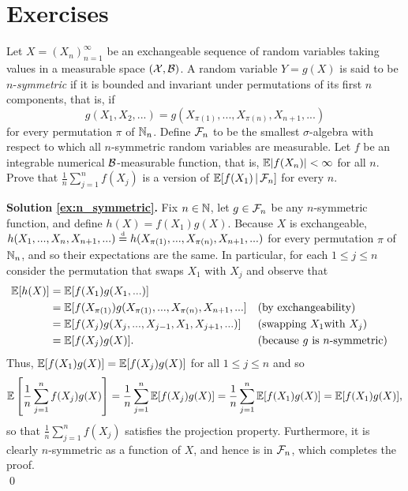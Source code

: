 

\section{Exercises}


\begin{exercise} \label{ex:n_symmetric}
	Let $X = (X_n)_{n=1}^{\infty}$ be an exchangeable sequence of random variables taking values in a measurable space $(\mathcal{X}, \mathcal{B})$. A random variable $Y = g(X)$ is said to be $n$-\textit{symmetric} if it is bounded and invariant under permutations of its first $n$ components, that is, if
	\begin{equation} \label{eq:n_symmetric}
		g(X_1, X_2, ...) = g(X_{\pi(1)}, ..., X_{\pi(n)}, X_{n+1}, ...)
	\end{equation}
	for every permutation $\pi$ of $\mathbb{N}_n$. Define $\mathcal{F}_n$ to be the smallest $\sigma$-algebra with respect to which all $n$-symmetric random variables are measurable. Let $f$ be an integrable numerical $\mathcal{B}$-measurable function, that is, $\mathbb{E} |f(X_n)| < \infty$ for all $n$. Prove that $\frac{1}{n} \sum_{j=1}^n f(X_j)$ is a version of $\mathbb{E}[ f(X_1) \, | \, \mathcal{F}_n ]$ for every $n$.
\end{exercise}

\textbf{Solution \ref{ex:n_symmetric}. \hspace{0.05cm}} Fix $n \in \mathbb{N}$, let $g \in \mathcal{F}_n$ be any $n$-symmetric function, and define $h(X) = f(X_1) g(X)$. Because $X$ is exchangeable, $h(X_1, ..., X_n, X_{n+1}, ...) \stackrel{\text{\rm\tiny d}}{=} h(X_{\pi(1)}, ..., X_{\pi(n)}, X_{n+1}, ...)$ for every permutation $\pi$ of $\mathbb{N}_n$, and so their expectations are the same. In particular, for each $1 \leq j \leq n$ consider the permutation that swaps $X_1$ with $X_j$ and observe that
\begin{align*}
	\mathbb{E} [h(X)] &= \mathbb{E}[f(X_1) g(X_1, ...) ] \\
		&= \mathbb{E} [f(X_{\pi(1)}) g(X_{\pi(1)}, ..., X_{\pi(n)}, X_{n+1}, ...] && \text{(by exchangeability)} \\
		&= \mathbb{E} [f(X_j) g(X_j, ..., X_{j-1}, X_1, X_{j+1}, ...) ] && \text{(swapping } X_1 \text{with } X_j)\\
		&= \mathbb{E} [f(X_j) g(X) ]. && \text{(because } g \text{ is } n \text{-symmetric)}
\end{align*}
Thus, $\mathbb{E}[f(X_1) g(X) ] = \mathbb{E} [f(X_j) g(X)]$ for all $1 \leq j \leq n$ and so
\begin{equation*}
	\mathbb{E} \left[ \frac{1}{n} \sum_{j=1}^n f(X_j) g(X) \right] = \frac{1}{n} \sum_{j=1}^n \mathbb{E}[ f(X_j) g(X) ] = \frac{1}{n} \sum_{j=1}^n \mathbb{E}[ f(X_1) g(X) ] = \mathbb{E}[ f(X_1) g(X) ],
\end{equation*}
so that $\frac{1}{n} \sum_{j=1}^n f(X_j)$ satisfies the projection property. Furthermore, it is clearly $n$-symmetric as a function of $X$, and hence is in $\mathcal{F}_n$, which completes the proof. \\
\qed

